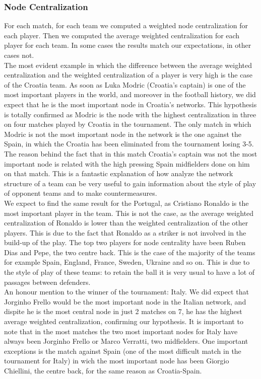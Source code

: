 \documentclass[12pt, a4paper]{article}
\begin{document}
\subsubsection{Node Centralization}
For each match, for each team we computed a weighted node centralization for each player. Then we computed the average weighted centralization for each player for each team. In some cases the results match our expectations, in other cases not. \\
The most evident example in which the difference between the average weighted centralization and the weighted centralization of a player is very high is the case of the Croatia team. As soon as Luka Modric (Croatia's captain) is one of the most important players in the world, and moreover in the football history, we did expect that he is the most important node in Croatia's networks. This hypothesis is totally confirmed as Modric is the node with the highest centralization in three on four matches played by Croatia in the tournament. The only match in which Modric is not the most important node in the network is the one against the Spain, in which the Croatia has been eliminated from the tournament losing 3-5. The reason behind the fact that in this match Croatia's captain was not the most important node is related with the high pressing Spain midfielders done on him on that match. This is a fantastic explanation of how analyze the network structure of a team can be very useful to gain information about the style of play of opponent teams and to make countermeasures.  \\ 
We expect to find the same result for the Portugal, as Cristiano Ronaldo is the most important player in the team. This is not the case, as the average weighted centralization of Ronaldo is lower than the weighted centralization of the other players. This is due to the fact that Ronaldo as a striker is not involved in the build-up of the play. The top two players for node centrality have been Ruben Dias and Pepe, the two centre back. This is the case of the majority of the teams for example Spain, England, France, Sweden, Ukraine and so on. This is due to the style of play of these teams: to retain the ball it is very usual to have a lot of passages between defenders. \\
An honour mention to the winner of the tournament: Italy. We did expect that Jorginho Frello would be the most important node in the Italian network, and dispite he is the most central node in just 2 matches on 7, he has the highest average weighted centralization, confirming our hypothesis. It is important to note that in the most matches the two most important nodes for Italy have always been Jorginho Frello or Marco Verratti, two midfielders. One important exceptions is the match against Spain (one of the most difficult match in the tournament for Italy) in wich the most important node has been Giorgio Chiellini, the centre back, for the same reason as Croatia-Spain. \\
\end{document}
